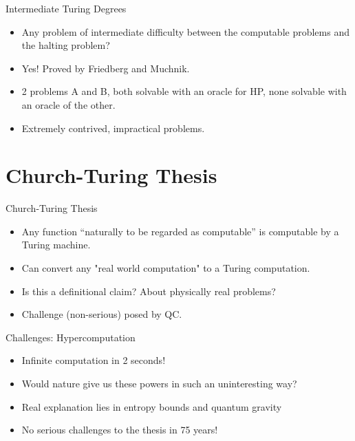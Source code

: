 \documentclass[
    11pt, %
    aspectratio=169, %
]{beamer}
\begin{document}
\begin{frame}{Intermediate Turing Degrees}
\begin{itemize}
    \item  Any problem of intermediate difficulty between the computable problems and the halting problem?
    \item Yes! Proved by Friedberg and Muchnik.
    \item 2 problems A and B, both solvable with an oracle for HP, none solvable with an oracle of the other.
    \item Extremely contrived, impractical problems.
\end{itemize}
    
\end{frame}

\section{Church-Turing Thesis}
\begin{frame}{Church-Turing Thesis}
\begin{itemize}
    \item Any function “naturally to be regarded as computable” is computable by a Turing machine.
    \item Can convert any "real world computation" to a Turing computation.
    \item Is this a definitional claim? About physically real problems?
    \item Challenge (non-serious) posed by QC.
\end{itemize}    
\end{frame}

\begin{frame}{Challenges: Hypercomputation}
    \begin{itemize}
        \item Infinite computation in 2 seconds!
        \item Would nature give us these powers in such an uninteresting way?
        \item Real explanation lies in entropy bounds and quantum gravity
        \item No serious challenges to the thesis in 75 years!
    \end{itemize}
\end{frame}
\end{document}
